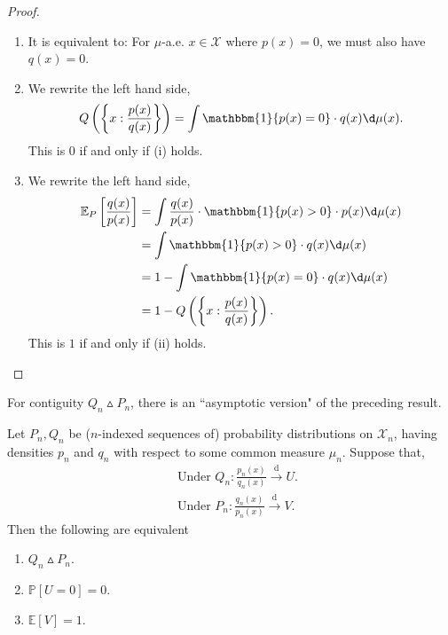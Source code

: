 \documentclass[a4paper]{article}
\begin{document}
\begin{proof}
	\quad
	\begin{enumerate}
		\item It is equivalent to: For $\mu$-a.e. $x \in \mathcal{X}$ where $p(x) = 0$, we must also have $q(x) = 0$.
		\item We rewrite the left hand side,
		\begin{equation*}
			Q\left(\left\{x: \frac{p(x)}{q(x)}\right\}\right) = \int \mathbbm{1}\{p(x) = 0\} \cdot q(x) \d \mu(x).
		\end{equation*} 
		This is $0$ if and only if (i) holds.
		\item We rewrite the left hand side,
		\begin{equation*}
			\begin{aligned}
				\mathbb{E}_P\left[\frac{q(x)}{p(x)}\right] &= \int \frac{q(x)}{p(x)} \cdot \mathbbm{1}\{p(x) > 0\} \cdot p(x) \d \mu (x) \\
				&= \int \mathbbm{1}\{p(x) > 0\} \cdot q(x) \d \mu (x) \\
				&= 1 - \int \mathbbm{1}\{p(x) = 0\} \cdot q(x) \d \mu(x) \\
				&= 1- Q\left(\left\{x: \frac{p(x)}{q(x)}\right\}\right).
			\end{aligned}
		\end{equation*}
		This is $1$ if and only if (ii) holds.
	\end{enumerate}
\end{proof}

\noindent For contiguity $Q_n \vartriangle P_n$, there is an ``asymptotic version" of the preceding result.

\begin{thm}
	Let $P_n,Q_n$ be ($n$-indexed sequences of) probability distributions on $\mathcal{X}_n$, having densities $p_n$ and $q_n$ with respect to some common measure $\mu_n$. Suppose that,
	\begin{equation*}
		\begin{aligned}
			& \text{ Under } Q_n: \frac{p_n(x)}{q_n(x)} \stackrel{\text{d}}{\longrightarrow} U. \\
			& \text{ Under } P_n: \frac{q_n(x)}{p_n(x)} \stackrel{\text{d}}{\longrightarrow} V.
		\end{aligned}
	\end{equation*}
	Then the following are equivalent
	\begin{enumerate}
		\item $Q_n \vartriangle P_n$.
		\item $\mathbb{P}[U = 0] = 0$.
		\item $\mathbb{E}[V] = 1$.
	\end{enumerate}
\end{thm}
\end{document}
